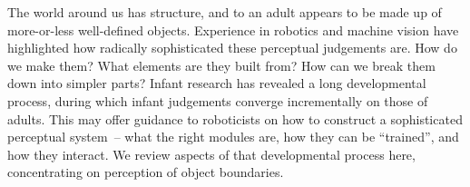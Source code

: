 
The world around us has structure, and to an adult appears to be made
up of more-or-less well-defined objects.  Experience in robotics and
machine vision have highlighted how radically sophisticated these
perceptual judgements are.
%
%
How do we make them?  What elements are they built from?  How can
we break them down into simpler parts?
%
Infant research has revealed a long developmental process, during
which infant judgements converge incrementally on those of adults.
%
This may offer guidance to roboticists on how to construct a
sophisticated perceptual system~-- what the right modules are, how
they can be ``trained'', and how they interact.  We review aspects 
of that developmental process here, concentrating on perception
of object boundaries.











